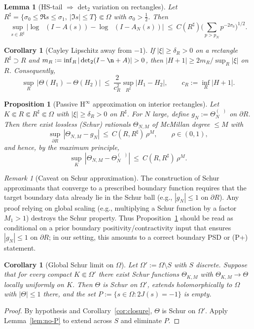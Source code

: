\documentclass[11pt]{article}
\newtheorem{proposition}[theorem]{Proposition}
\newtheorem{lemma}[theorem]{Lemma}
\newtheorem{corollary}[theorem]{Corollary}
\theoremstyle{remark}
\newtheorem{remark}[theorem]{Remark}
\DeclareMathOperator{\dettwo}{det_2}
\begin{document}
\begin{lemma}[HS-tail \(\Rightarrow\) det$_2$ variation on rectangles]\label{lem:HS-tail-rectangle}
Let \(R^\sharp=\{\sigma_0\le \Re s\le \sigma_1,\ |\Im s|\le T\}\Subset\Omega\) with \(\sigma_0>\tfrac12\). Then
\[
 \sup_{s\in R^\sharp}\big|\log\dettwo(I-A(s))\!-\!\log\dettwo(I-A_N(s))\big|\ \le\ C(R^\sharp)\Big(\sum_{p>p_N}p^{-2\sigma_0}\Big)^{1/2}.
\]
\end{lemma}

\begin{corollary}[Cayley Lipschitz away from \(-1\)]\label{cor:Cayley-rect}
If \(|\xi|\ge \delta_R>0\) on a rectangle \(R^\sharp\supset R\) and \(m_R:=\inf_{R}|\dettwo(I\!-\n+A)|>0\), then \(|H+1|\ge 2m_R/\sup_{R}|\xi|\) on \(R\). Consequently,
\[
 \sup_{R}\,\big|\Theta(H_1)-\Theta(H_2)\big|\ \le\ \frac{2}{c_R^2}\sup_{R^\sharp}|H_1-H_2|,\qquad c_R:=\inf_{R}|H+1|.
\]
\end{corollary}

\begin{proposition}[Passive H$^\infty$ approximation on interior rectangles]\label{prop:hinf-passive}
Let \(K\Subset R\Subset R^\sharp\Subset\Omega\) with \(|\xi|\ge \delta_R>0\) on \(R^\sharp\). For \(N\) large, define \(g_N:=\Theta_N^{(\dettwo)}\) on \(\partial R\). Then there exist lossless (Schur) rationals \(\Theta_{N,M}\) of McMillan degree \(\le M\) with
\[
 \sup_{\partial R}\,|\Theta_{N,M}-g_N|\ \le\ C(R,R^\sharp)\,\rho^{M},\qquad \rho\in(0,1),
\]
and hence, by the maximum principle,
\[
 \sup_{K}\,|\Theta_{N,M}-\Theta_N^{(\dettwo)}|\ \le\ C(R,R^\sharp)\,\rho^{M}.
\]
\end{proposition}
\begin{remark}[Caveat on Schur approximation]
The construction of Schur approximants that converge to a prescribed boundary function requires that the target boundary data already lie in the Schur ball (e.g., \(|g_N|\le 1\) on \(\partial R\)). Any proof relying on global scaling (e.g., multiplying a Schur function by a factor \(M_1>1\)) destroys the Schur property. Thus Proposition~\ref{prop:hinf-passive} should be read as conditional on a prior boundary positivity/contractivity input that ensures \(|g_N|\le 1\) on \(\partial R\); in our setting, this amounts to a correct boundary PSD or (P+) statement.
\end{remark}

\begin{corollary}[Global Schur limit on \(\Omega\)]
Let \(\Omega':=\Omega\setminus S\) with \(S\) discrete. Suppose that for every compact \(K\Subset\Omega'\) there exist Schur functions \(\Theta_{K,M}\) with \(\Theta_{K,M}\to\Theta\) locally uniformly on \(K\). Then \(\Theta\) is Schur on \(\Omega'\), extends holomorphically to \(\Omega\) with \(|\Theta|\le 1\) there, and the set \(P:=\{s\in\Omega: 2J(s)=-1\}\) is empty.
\end{corollary}
\begin{proof}
By hypothesis and Corollary~\ref{cor:closure}, \(\Theta\) is Schur on \(\Omega'\). Apply Lemma~\ref{lem:no-P} to extend across \(S\) and eliminate \(P\). 
\end{proof}
\end{document}
